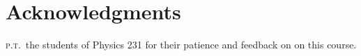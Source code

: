 \documentclass[12pt]{article}
\begin{document}
\section*{Acknowledgments}
%
\textsc{p.t.}\ the students of Physics 231 for their patience and feedback on on this course.
%



% 
\end{document}
